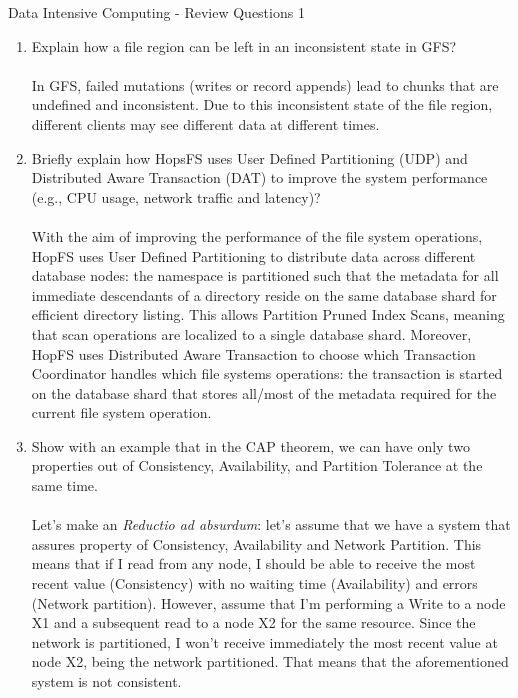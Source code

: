 \documentclass[]{report}
\begin{document}
\begin{center}
 {\Large Data Intensive Computing - Review Questions 1}
\end{center}
\vspace{1cm}
\justify
\begin{enumerate}
 \item Explain how a file region can be left in an inconsistent state in GFS?\\\\
In GFS, failed mutations (writes or record appends) lead to chunks that are undefined and inconsistent. Due to this inconsistent state of the file region, different clients may see different data at different times.

 
 \item Briefly explain how HopsFS uses User Defined Partitioning (UDP) and Distributed Aware Transaction (DAT) to improve the system performance (e.g., CPU usage, network traffic and latency)?\\\\
With the aim of improving the performance of the file system operations, HopFS uses User Defined Partitioning to distribute data across different database nodes: the namespace is partitioned
such that the metadata for all immediate descendants of a directory reside on the same database shard for efficient directory listing. This allows Partition Pruned Index Scans, meaning that scan operations are localized to a single database shard.
Moreover, HopFS uses Distributed Aware Transaction to choose which Transaction Coordinator handles which file systems operations: the transaction is started on the database shard that stores all/most of the metadata required for the current file system operation.

 
 \item Show with an example that in the CAP theorem, we can have only two properties out of Consistency, Availability, and Partition Tolerance at the same time.\\\\
 Let's make an \textit{Reductio ad absurdum}: let's assume that we have a system that assures property of Consistency, Availability and Network Partition. This means that if I read from any node, I should be able to receive the most recent value (Consistency) with no waiting time (Availability) and errors (Network partition). However, assume that I'm performing a Write to a node X1 and a subsequent read to a node X2 for the same resource. Since the network is partitioned, I won't receive immediately the most recent value at node X2, being the network partitioned. That means that the aforementioned system is not consistent.
 

\end{enumerate}
\end{document}
